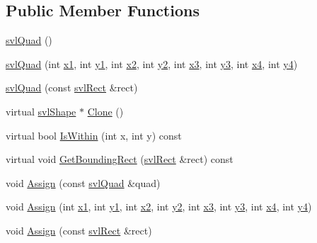 \subsection*{Public Member Functions}
\begin{DoxyCompactItemize}
\item 
\hyperlink{structsvl_quad_adc7cb343b8cbd3d4e937aef6b412fe74}{svl\+Quad} ()
\item 
\hyperlink{structsvl_quad_abf897137dbfbc6d04dd301b2387640ea}{svl\+Quad} (int \hyperlink{structsvl_quad_addbddfb4d8835305e7993bc95beb5396}{x1}, int \hyperlink{structsvl_quad_a27d5a63998c61d8e3d0a6a8d49b0f867}{y1}, int \hyperlink{structsvl_quad_ad76051b0fd6671b8c7d8a789a0c0bf2b}{x2}, int \hyperlink{structsvl_quad_af793c440c3bca87d594bb157fbf7a129}{y2}, int \hyperlink{structsvl_quad_ab057dbdbfeafdb523773a523d8bb3ed3}{x3}, int \hyperlink{structsvl_quad_a0e4a4b82cc4977a4ac0e9159983e0d89}{y3}, int \hyperlink{structsvl_quad_aa2161465036bb13654d38e6aa4272493}{x4}, int \hyperlink{structsvl_quad_ab868a587999108937b8dd2748e90e1dd}{y4})
\item 
\hyperlink{structsvl_quad_a47bcb9855a08a7c2adfb6446b284d691}{svl\+Quad} (const \hyperlink{structsvl_rect}{svl\+Rect} \&rect)
\item 
virtual \hyperlink{structsvl_shape}{svl\+Shape} $\ast$ \hyperlink{structsvl_quad_aafafc8548efd62a8004ebd5524f591cc}{Clone} ()
\item 
virtual bool \hyperlink{structsvl_quad_abedb508327ec828272250fb997487c84}{Is\+Within} (int x, int y) const 
\item 
virtual void \hyperlink{structsvl_quad_ae9df9c90e19d699de3a48af7182f175f}{Get\+Bounding\+Rect} (\hyperlink{structsvl_rect}{svl\+Rect} \&rect) const 
\item 
void \hyperlink{structsvl_quad_a7d4eee8e04f8e0e32c2f0662a75e4b1e}{Assign} (const \hyperlink{structsvl_quad}{svl\+Quad} \&quad)
\item 
void \hyperlink{structsvl_quad_a67a093f2b93f00441e5221fbcc33d0f1}{Assign} (int \hyperlink{structsvl_quad_addbddfb4d8835305e7993bc95beb5396}{x1}, int \hyperlink{structsvl_quad_a27d5a63998c61d8e3d0a6a8d49b0f867}{y1}, int \hyperlink{structsvl_quad_ad76051b0fd6671b8c7d8a789a0c0bf2b}{x2}, int \hyperlink{structsvl_quad_af793c440c3bca87d594bb157fbf7a129}{y2}, int \hyperlink{structsvl_quad_ab057dbdbfeafdb523773a523d8bb3ed3}{x3}, int \hyperlink{structsvl_quad_a0e4a4b82cc4977a4ac0e9159983e0d89}{y3}, int \hyperlink{structsvl_quad_aa2161465036bb13654d38e6aa4272493}{x4}, int \hyperlink{structsvl_quad_ab868a587999108937b8dd2748e90e1dd}{y4})
\item 
void \hyperlink{structsvl_quad_a2b4ca7b0a72b7b3b87679d990ee4ccfa}{Assign} (const \hyperlink{structsvl_rect}{svl\+Rect} \&rect)
\end{DoxyCompactItemize}
